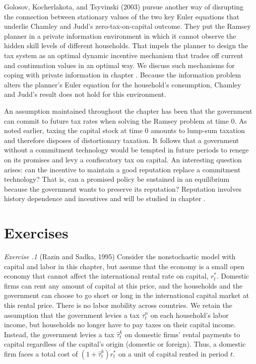 Golosov, Kocherlakota,  and Tsyvinski  (2003) pursue another way
of disrupting the connection between stationary values of the two
key Euler equations that underlie Chamley and Judd's
zero-tax-on-capital outcome.  They put the Ramsey planner in a
private information environment in which it cannot observe the
hidden skill levels of  different households.  That impels the
planner to
design the tax system as an optimal dynamic
incentive mechanism that trades off current and continuation
values in an optimal way. We discuss such mechanisms for coping
with private information in chapter
. Because the information problem alters the
planner's Euler equation for the household's consumption, Chamley
and Judd's result does not hold for this environment.

An  assumption maintained throughout the chapter has been that
the government can commit to future tax rates when solving
the Ramsey problem at time 0. As noted earlier,
taxing the capital stock at time 0 amounts to lump-sum
taxation and therefore disposes of
distortionary taxation. It follows that
a government without a commitment technology would be tempted
in future periods to renege on its promises and levy a
confiscatory tax on capital. An interesting question arises:
 can the incentive to maintain a good reputation replace
a commitment
technology? That is, can a  promised policy be sustained in
an equilibrium because the government  wants to preserve its
reputation? Reputation involves history dependence and incentives and
will be studied in chapter .



\showchaptIDfalse
\showsectIDfalse
\section{Exercises}
\showchaptIDtrue
\showsectIDtrue
\noindent
{\it Exercise \the\chapternum.1} 
(Razin and Sadka, 1995)
\medskip
\noindent
Consider the nonstochastic model with capital and labor in this
chapter, but assume that
the economy is a small open economy that cannot affect the
international rental rate on capital, $r^*_t$.
Domestic firms can rent any amount of capital at this price, and
the households and the government can choose to go short or long in
the international capital market at this rental price. There is
no labor mobility across countries.
We retain the assumption that the government levies a tax $\tau^n_t$ on
each household's labor income, but households no longer have
to pay taxes on their capital income. Instead, the
government levies a tax $\hat \tau^k_t$ on domestic firms' rental
payments to capital regardless of the capital's origin (domestic
or foreign). Thus, a
domestic firm faces a total cost of $(1+\hat \tau^k_t)r^*_t$ on a
unit of capital rented in period $t$.

